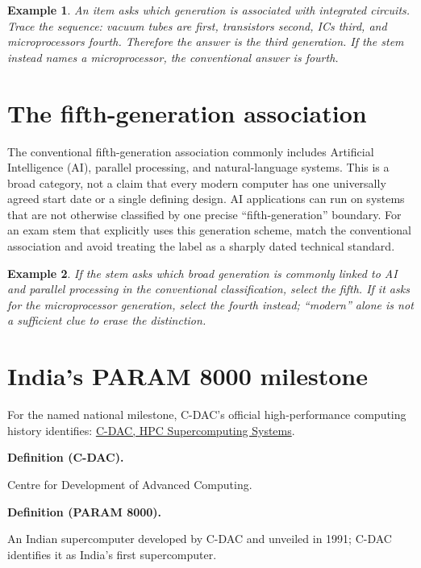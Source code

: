 \documentclass[11pt]{article}
\newtheorem{example}{Example}[section]
\newenvironment{definitionbox}[1]{%
  \par\noindent\textbf{Definition (#1).}\ \itshape
}{\par\vspace{0.3em}}
\begin{document}
\begin{example}
An item asks which generation is associated with integrated circuits. Trace
the sequence: vacuum tubes are first, transistors second, ICs third, and
microprocessors fourth. Therefore the answer is the third generation. If
the stem instead names a microprocessor, the conventional answer is fourth.
\end{example}

\section{The fifth-generation association}
The conventional fifth-generation association commonly includes Artificial
Intelligence (AI), parallel processing, and natural-language systems. This
is a broad category, not a claim that every modern computer has one
universally agreed start date or a single defining design. AI applications
can run on systems that are not otherwise classified by one precise
``fifth-generation'' boundary. For an exam stem that explicitly uses this
generation scheme, match the conventional association and avoid treating
the label as a sharply dated technical standard.

\begin{example}
If the stem asks which broad generation is commonly linked to AI and
parallel processing in the conventional classification, select the fifth.
If it asks for the microprocessor generation, select the fourth instead;
``modern'' alone is not a sufficient clue to erase the distinction.
\end{example}

\section{India's PARAM 8000 milestone}
For the named national milestone, C-DAC's official high-performance
computing history identifies:
\href{https://cdac.in/index.aspx?id=hpc_ss_supercomputing_systems}
{C-DAC, HPC Supercomputing Systems}.

\begin{definitionbox}{C-DAC}
Centre for Development of Advanced Computing.
\end{definitionbox}

\begin{definitionbox}{PARAM 8000}
An Indian supercomputer developed by C-DAC and unveiled in 1991; C-DAC
identifies it as India's first supercomputer.
\end{definitionbox}
\end{document}
